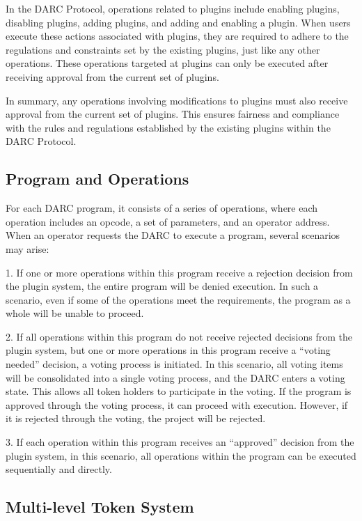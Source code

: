 \documentclass[main.tex]{subfiles}
\begin{document}
In the DARC Protocol, operations related to plugins include enabling plugins, disabling plugins, adding plugins, and adding and enabling a plugin. When users execute these actions associated with plugins, they are required to adhere to the regulations and constraints set by the existing plugins, just like any other operations. These operations targeted at plugins can only be executed after receiving approval from the current set of plugins.

In summary, any operations involving modifications to plugins must also receive approval from the current set of plugins. This ensures fairness and compliance with the rules and regulations established by the existing plugins within the DARC Protocol.


\subsection{Program and Operations}

For each DARC program, it consists of a series of operations, where each operation includes an opcode, a set of parameters, and an operator address. When an operator requests the DARC to execute a program, several scenarios may arise:

1. If one or more operations within this program receive a rejection decision from the plugin system, the entire program will be denied execution. In such a scenario, even if some of the operations meet the requirements, the program as a whole will be unable to proceed. 

2. If all operations within this program do not receive rejected decisions from the plugin system, but one or more operations in this program receive a ``voting needed'' decision, a voting process is initiated. In this scenario, all voting items will be consolidated into a single voting process, and the DARC enters a voting state. This allows all token holders to participate in the voting. If the program is approved through the voting process, it can proceed with execution. However, if it is rejected through the voting, the project will be rejected.

3. If each operation within this program receives an ``approved'' decision from the plugin system, in this scenario, all operations within the program can be executed sequentially and directly.

\subsection{Multi-level Token System}
\end{document}
